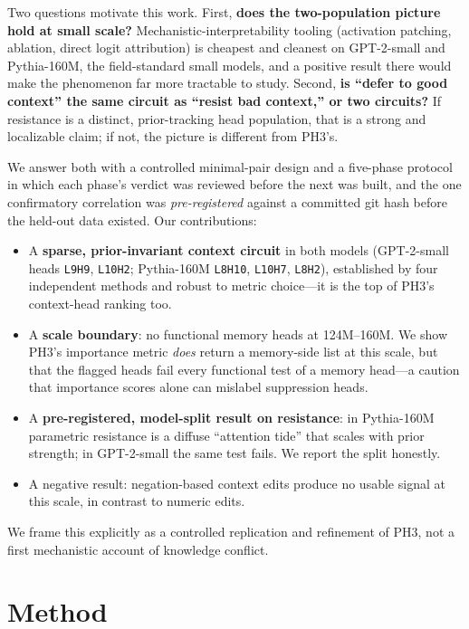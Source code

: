 \documentclass[11pt]{article}
\begin{document}
Two questions motivate this work. First, \textbf{does the two-population
picture hold at small scale?} Mechanistic-interpretability tooling
(activation patching, ablation, direct logit attribution) is cheapest and
cleanest on GPT-2-small and Pythia-160M, the field-standard small models, and
a positive result there would make the phenomenon far more tractable to study.
Second, \textbf{is ``defer to good context'' the same circuit as ``resist bad
context,'' or two circuits?} If resistance is a distinct, prior-tracking head
population, that is a strong and localizable claim; if not, the picture is
different from PH3's.

We answer both with a controlled minimal-pair design and a five-phase
protocol in which each phase's verdict was reviewed before the next was built,
and the one confirmatory correlation was \emph{pre-registered} against a
committed git hash before the held-out data existed. Our contributions:

\begin{itemize}
\item A \textbf{sparse, prior-invariant context circuit} in both models
(GPT-2-small heads \texttt{L9H9}, \texttt{L10H2}; Pythia-160M \texttt{L8H10},
\texttt{L10H7}, \texttt{L8H2}), established by four independent methods and
robust to metric choice---it is the top of PH3's context-head ranking too.
\item A \textbf{scale boundary}: no functional memory heads at 124M--160M. We
show PH3's importance metric \emph{does} return a memory-side list at this
scale, but that the flagged heads fail every functional test of a memory
head---a caution that importance scores alone can mislabel suppression heads.
\item A \textbf{pre-registered, model-split result on resistance}: in
Pythia-160M parametric resistance is a diffuse ``attention tide'' that scales
with prior strength; in GPT-2-small the same test fails. We report the split
honestly.
\item A negative result: negation-based context edits produce no usable signal
at this scale, in contrast to numeric edits.
\end{itemize}

We frame this explicitly as a controlled replication and refinement of PH3,
not a first mechanistic account of knowledge conflict.

\section{Method}
\label{sec:method}
\end{document}
